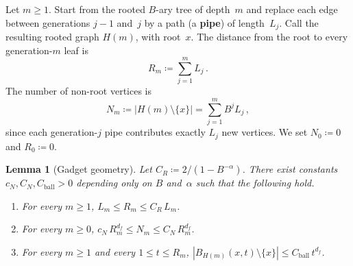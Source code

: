 \documentclass[aop]{imsart}
\theoremstyle{plain}
\newtheorem{lemma}[theorem]{Lemma}
\theoremstyle{definition}
\begin{document}
	Let $m\geq 1$.  Start from the rooted $B$-ary tree of depth~$m$ and replace each edge between generations $j{-}1$ and~$j$ by a path (a \textbf{pipe}) of length~$L_j$.  Call the resulting rooted graph $H(m)$, with root~$x$.  The distance from the root to every generation-$m$ leaf is
	\begin{equation}
		R_m\coloneqq\sum_{j=1}^m L_j\,.
	\end{equation}
	The number of non-root vertices is
	\begin{equation}
		N_m\coloneqq|H(m)\setminus\{x\}|
		=\sum_{j=1}^m B^j L_j\,,
	\end{equation}
	since each generation-$j$ pipe contributes exactly $L_j$ new vertices.  We set $N_0\coloneqq 0$ and $R_0\coloneqq 0$.
	
	\begin{lemma}[Gadget geometry]\label{lem:rec-geometry}
		Let $C_R\coloneqq 2/(1-B^{-\alpha})$.  There exist constants $c_N, C_N, C_{\mathrm{ball}}>0$ depending only on $B$ and~$\alpha$ such that the following hold.
		\begin{enumerate}
			\item[\textup{(a)}] For every $m\geq 1$, $L_m\leq R_m\leq C_R\,L_m$.
			\item[\textup{(b)}] For every $m\geq 0$, $c_N\,R_m^{d_f}\leq N_m\leq C_N\,R_m^{d_f}$.
			\item[\textup{(c)}] For every $m\geq 1$ and every $1\leq t\leq R_m$, $|B_{H(m)}(x,t)\setminus\{x\}|\leq C_{\mathrm{ball}}\,t^{d_f}$.
		\end{enumerate}
	\end{lemma}
	
\end{document}

